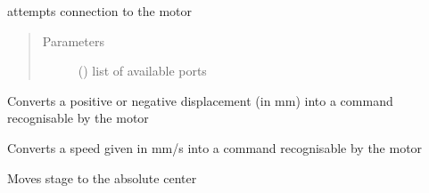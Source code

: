 \documentclass[letterpaper,10pt,english]{sphinxmanual}
\begin{document}
\begin{fulllineitems}
\begin{fulllineitems}
\label{\detokenize{drivers:drivers.Motor._connect}}
attempts connection to the motor
\begin{quote}\begin{description}
\item[{Parameters}] \leavevmode
{} (\sphinxstyleliteralemphasis{\sphinxupquote{, }}) \textendash{} list of available ports

\end{description}\end{quote}

\end{fulllineitems}


\begin{fulllineitems}
\label{\detokenize{drivers:drivers.Motor._convertdisplacement}}
Converts a positive or negative displacement (in mm) into a command recognisable by the motor

\end{fulllineitems}


\begin{fulllineitems}
\label{\detokenize{drivers:drivers.Motor._convertspeed}}
Converts a speed given in mm/s into a command recognisable by the motor

\end{fulllineitems}


\begin{fulllineitems}
\label{\detokenize{drivers:drivers.Motor.center}}
Moves stage to the absolute center

\end{fulllineitems}


\end{fulllineitems}
\end{document}

